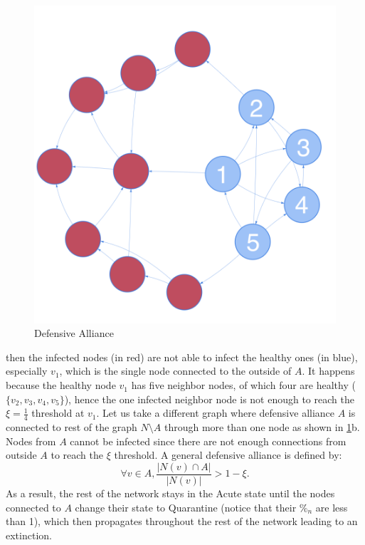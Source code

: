 \begin{figure}[h!]
{\begin{minipage}[c][1\width]{
	   0.5\textwidth}
	   \includegraphics[height=1.0\textwidth]{img/offensive-alliance-clique-numbered.png}
	\end{minipage}}
\caption{Defensive Alliance}
\label{fig:defensive-alliance}
\end{figure}
then the infected nodes (in red) are not able to infect the healthy ones (in blue), especially $v_1$, which is the single node connected to the outside of $A$. It happens because the healthy node $v_1$ has five neighbor nodes, of which four are healthy ($\{v_2,v_3,v_4,v_5\}$), hence the one infected neighbor node is not enough to reach the $\xi = \frac{1}{4}$ threshold at $v_1$.
Let us take a different graph where defensive alliance $A$ is connected to rest of the graph $N \setminus A$ through more than one node as shown in \ref{fig:defensive-alliance}b. Nodes from $A$ cannot be infected since there are not enough connections from outside $A$ to reach the $\xi$ threshold. A general defensive alliance is defined by: 
\begin{equation}
\forall{v \in A}, \frac{|N(v) \cap A|}{|N(v)|} > 1 - \xi.
\end{equation}
As a result, the rest of the network stays in the Acute state until the nodes connected to $A$ change their state to Quarantine (notice that their $\%_n$ are less than 1), which then propagates throughout the rest of the network leading to an extinction. 

